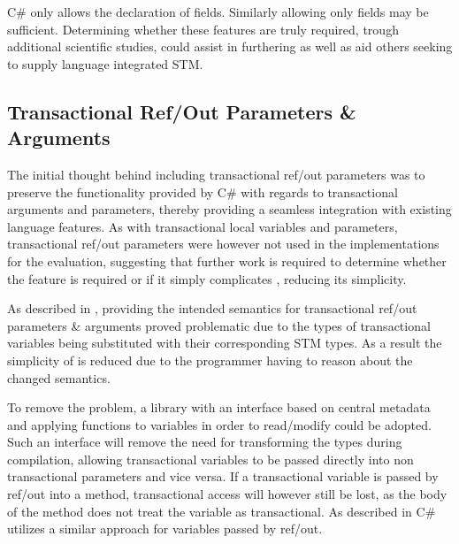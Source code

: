 C\# only allows the declaration of  fields. Similarly allowing only  fields may be sufficient. Determining whether these features are truly required, trough additional scientific studies, could assist in furthering \stmname as well as aid others seeking to supply language integrated \ac{STM}. 

\subsection{Transactional Ref/Out Parameters \& Arguments}\label{subse:reflection_ref_out}
The initial thought behind including transactional ref/out parameters was to preserve the functionality provided by C\# with regards to transactional arguments and parameters, thereby providing a seamless integration with existing language features. As with transactional local variables and parameters, transactional ref/out parameters were however not used in the implementations for the evaluation, suggesting that further work is required to determine whether the feature is required or if it simply complicates \stmname, reducing its simplicity. 

As described in , providing the intended semantics for transactional ref/out parameters \& arguments proved problematic due to the types of transactional variables being substituted with their corresponding \ac{STM} types. As a result the simplicity of \stmname is reduced due to the programmer having to reason about the changed semantics.

To remove the problem, a library with an interface based on central metadata and applying functions to variables in order to read/modify could be adopted. Such an interface will remove the need for transforming the types during compilation, allowing transactional variables to be passed directly into non transactional parameters and vice versa. If a transactional variable is passed by ref/out into a method, transactional access will however still be lost, as the body of the method does not treat the variable as transactional. As described in  C\# utilizes a similar approach for  variables passed by ref/out.
 
